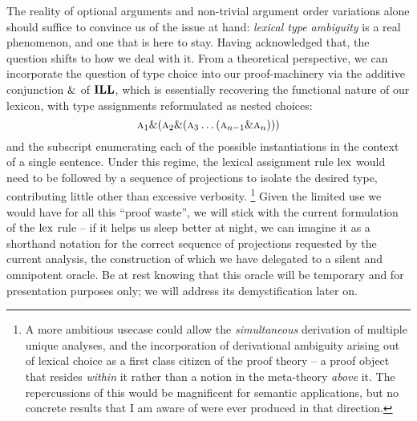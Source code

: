 The reality of optional arguments and non-trivial argument order variations alone should suffice to convince us of the issue at hand: \textit{lexical type ambiguity} is a real phenomenon, and one that is here to stay.
Having acknowledged that, the question shifts to how we deal with it.
From a theoretical perspective, we can incorporate the question of type choice into our proof-machinery via the additive conjunction ${\&}$ of $\textbf{ILL}$, which is essentially recovering the functional nature of our lexicon, with type assignments reformulated as nested choices:
\[
 \smallprop{A}_1 \with (\smallprop{A}_2 \with (\smallprop{A}_3 \dots (\smallprop{A}_{n-1}\with\smallprop{A}_{n})))
\]
and the subscript enumerating each of the possible instantiations in the context of a single sentence.
Under this regime, the lexical assignment rule $\mathrm{lex}$ would need to be followed by a sequence of projections to isolate the desired type, contributing little other than excessive verbosity.%
\footnote{
A more ambitious usecase could allow the \textit{simultaneous} derivation of multiple unique analyses, and the incorporation of derivational ambiguity arising out of lexical choice as a first class citizen of the proof theory -- a proof object that resides \textit{within} it rather than a notion in the meta-theory \textit{above} it.
The repercussions of this would be magnificent for semantic applications, but no concrete results that I am aware of were ever produced in that direction.}
Given the limited use we would have for all this ``proof waste'', we will stick with the current formulation of the $\mathrm{lex}$ rule -- if it helps us sleep better at night, we can imagine it as a shorthand notation for the correct sequence of projections requested by the current analysis, the construction of which we have delegated to a silent and omnipotent oracle.
Be at rest knowing that this oracle will be temporary and for presentation purposes only; we will address its demystification later on.


